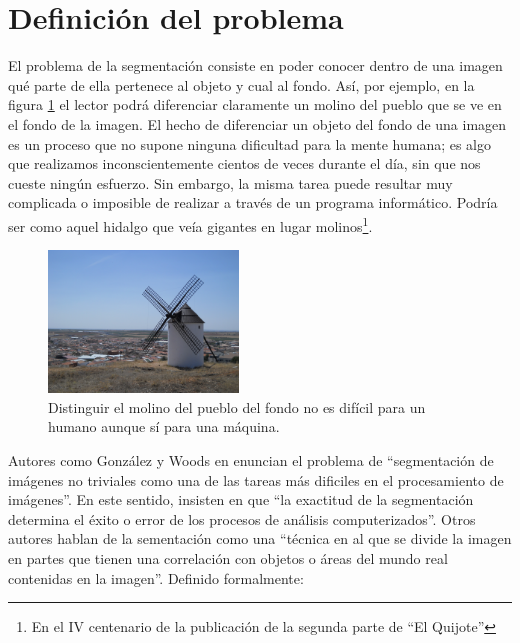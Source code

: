 \section{Definición del problema}\label{sec:definicion}
El problema de la segmentación consiste en poder conocer dentro de una imagen qué parte de ella pertenece al objeto y cual al fondo. Así, por ejemplo, en la figura \ref{img:ejemplomolino} el lector podrá diferenciar claramente un molino del pueblo que se ve en el fondo de la imagen. El hecho de diferenciar un objeto del fondo de una imagen es un proceso que no supone ninguna dificultad para la mente humana; es algo que realizamos inconscientemente cientos de veces durante el día, sin que nos cueste ningún esfuerzo. Sin embargo, la misma tarea puede resultar muy complicada o imposible de realizar a través de un programa informático. Podría ser como aquel hidalgo que veía gigantes en lugar molinos\footnote{En el IV centenario de la publicación de la segunda parte de ``El Quijote''}.

\begin{figure}
	\centering
	\includegraphics[width=0.45\textwidth]{img/molino.jpg}
	\caption{Distinguir el molino del pueblo del fondo no es difícil para un humano aunque sí para una máquina.}
	\label{img:ejemplomolino}
\end{figure}

 Autores como González y Woods en \cite{lib:gonzalez} enuncian el problema de ``segmentación de imágenes no triviales como una de las tareas más dificiles en el procesamiento de imágenes''. En este sentido, insisten en que ``la exactitud de la segmentación determina el éxito o error de los procesos de análisis computerizados''. Otros autores \cite{lib:sonka} hablan de la sementación como una ``técnica en al que se divide la imagen en partes que tienen una correlación con objetos o áreas del mundo real contenidas en la imagen''. Definido formalmente:

